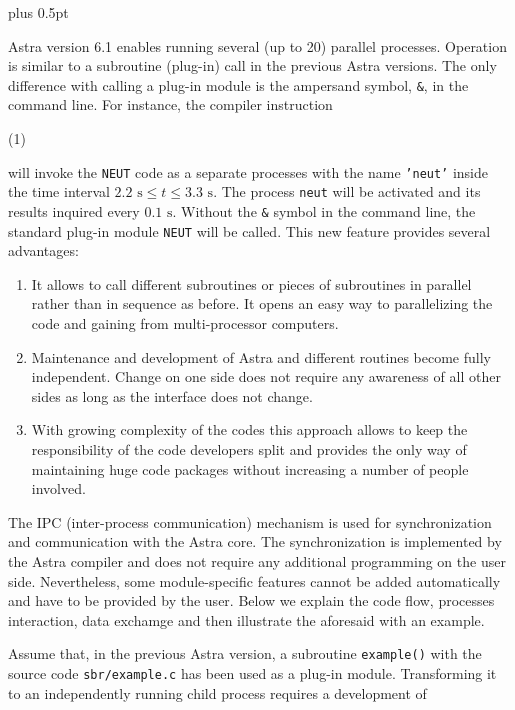 \documentclass[12pt]{article}
\newcommand{\tw}[1]{\texttt{#1}}
\begin{document}
\normalsize
\baselineskip=16pt plus 0.5pt

Astra version 6.1 enables running several (up to 20) parallel processes.
Operation is similar to a subroutine (plug-in) call in the previous Astra
versions. 
The only difference with calling a plug-in module is the ampersand
symbol, {\tt\&}, in the command line. 
For instance, the compiler instruction 

\hspace*{25pt}{\tt
NEUT~\&~:~0.1 :~2.2~:~3.3;
}\hfill(1)

will invoke the \tw{NEUT} code as a separate processes with the name
\tw{'neut'} inside the time interval $2.2\mbox{~s}\leq t\leq 3.3\mbox{~s}$. 
The process \tw{neut} will be activated and its results inquired every
$0.1\mbox{~s}$. 
Without the {\tt\&} symbol in the command line, the standard plug-in module
\tw{NEUT} will be called.
This new feature provides several advantages:
\vspace*{-\parskip}
\begin{enumerate}
\item It allows to call different subroutines or pieces of subroutines
  in parallel rather than in sequence as before.
  It opens an easy way to parallelizing the code and gaining from
  multi-processor computers. 
\item Maintenance and development of Astra and different routines become fully
  independent. 
  Change on one side does not require any awareness of all other sides as long
  as the interface does not change.
\item With growing complexity of the codes this approach allows to keep the
  responsibility of the code developers split and provides the only way of 
  maintaining huge code packages without increasing a number of people
  involved. 
\end{enumerate}\vspace*{-\parskip}

The IPC (inter-process communication) mechanism is used for synchronization
and communication with the Astra core. 
The synchronization is implemented by the Astra compiler and
does not require any additional programming on the user side.
Nevertheless, some module-specific features cannot be added automatically and
have to be provided by the user. 
Below we explain the code flow, processes interaction, data exchamge 
and then illustrate the aforesaid with an example.  

Assume that, in the previous Astra version, a subroutine \tw{example()} with
the source code \tw{sbr/example.c} has been used as a plug-in module. 
Transforming it to an independently running child process
requires a development of
\end{document}
